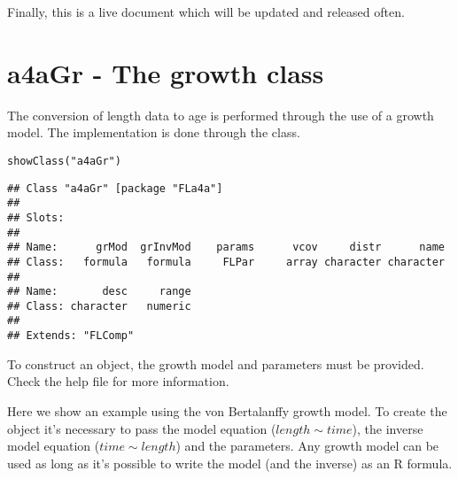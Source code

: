 \documentclass[a4paper,english,10pt]{article}\usepackage[]{graphicx}\usepackage[]{color}
\makeatletter
\newcommand{\hlstr}[1]{\textcolor[rgb]{0.063,0.58,0.627}{#1}}%
\newcommand{\hlstd}[1]{\textcolor[rgb]{0.196,0.196,0.196}{#1}}%
\newcommand{\hlkwd}[1]{\textcolor[rgb]{0.78,0.227,0.412}{#1}}%
\newenvironment{kframe}{%
 \def\at@end@of@kframe{}%
 \ifinner\ifhmode%
  \def\at@end@of@kframe{\end{minipage}}%
  \begin{minipage}{\columnwidth}%
 \fi\fi%
 \def\FrameCommand##1{\hskip\@totalleftmargin \hskip-\fboxsep
 \colorbox{shadecolor}{##1}\hskip-\fboxsep
     \hskip-\linewidth \hskip-\@totalleftmargin \hskip\columnwidth}%
 \MakeFramed {\advance\hsize-\width
   \@totalleftmargin\z@ \linewidth\hsize
   \@setminipage}}%
 {\par\unskip\endMakeFramed%
 \at@end@of@kframe}
\newenvironment{knitrout}{}{} %
\makeatother
\begin{document}


Finally, this is a live document which will be updated and released often.



\section{a4aGr - The growth class}

The conversion of length data to age is performed through the use of a growth model. The implementation is done through the  class.

\begin{knitrout}
\color{fgcolor}\begin{kframe}
\begin{alltt}
\hlkwd{showClass}\hlstd{(}\hlstr{"a4aGr"}\hlstd{)}
\end{alltt}
\begin{verbatim}
## Class "a4aGr" [package "FLa4a"]
## 
## Slots:
##                                                                   
## Name:      grMod  grInvMod    params      vcov     distr      name
## Class:   formula   formula     FLPar     array character character
##                           
## Name:       desc     range
## Class: character   numeric
## 
## Extends: "FLComp"
\end{verbatim}
\end{kframe}
\end{knitrout}

To construct an  object, the growth model and parameters must be provided.
Check the help file for more information.

Here we show an example using the von Bertalanffy growth model. To create the  object it's necessary to pass the model equation ($length \sim time$), the inverse model equation ($time \sim length$) and the parameters. Any growth model can be used as long as it's possible to write the model (and the inverse) as an R formula.
\end{document}

